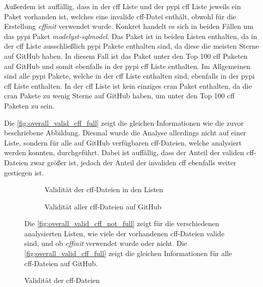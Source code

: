 Außerdem ist auffällig, dass in der \gls{cff} Liste und der \gls{pypi} \gls{cff} Liste jeweils ein Paket vorhanden ist, welches eine invalide \gls{cff}-Datei enthält, obwohl für die Erstellung \emph{cffinit} verwendet wurde.
Konkret handelt es sich in beiden Fällen um das \gls{pypi} Paket \emph{modelyst-sqlmodel}.
Das Paket ist in beiden Listen enthalten, da in der \gls{cff} Liste ausschließlich \gls{pypi} Pakete enthalten sind, da diese die meisten Sterne auf GitHub haben.
In diesem Fall ist das Paket unter den Top 100 \gls{cff} Paketen auf GitHub und somit ebenfalls in der \gls{pypi} \gls{cff} Liste enthalten.
Im Allgemeinen sind alle \gls{pypi} Pakete, welche in der \gls{cff} Liste enthalten sind, ebenfalls in der \gls{pypi} \gls{cff} Liste enthalten.
In der \gls{cff} Liste ist kein einziges \gls{cran} Paket enthalten, da die \gls{cran} Pakete zu wenig Sterne auf GitHub haben, um unter den Top 100 \gls{cff} Paketen zu sein.

Die \autoref{fig:overall_valid_cff_full} zeigt die gleichen Informationen wie die zuvor beschriebene Abbildung.
Diesmal wurde die Analyse allerdings nicht auf einer Liste, sondern für alle auf GitHub verfügbaren \gls{cff}-Dateien, welche analysiert werden konnten, durchgeführt.
Dabei ist auffällig, dass der Anteil der validen \gls{cff}-Dateien zwar größer ist, jedoch der Anteil der invaliden \gls{cff} ebenfalls weiter gestiegen ist.

\begin{figure}
    \begin{subfigure}{.5\textwidth}
        \centering
        
        \caption{Validität der \gls{cff}-Dateien in den Listen}
        \label{fig:overall_valid_cff_not_full}
    \end{subfigure}%
    \begin{subfigure}{.5\textwidth}
        \centering
        
        \caption{Validität aller \gls{cff}-Dateien auf GitHub}
        \label{fig:overall_valid_cff_full}
    \end{subfigure}
    \caption{Validität der \gls{cff}-Dateien}
    \label{fig:overall_valid_cff}
    \small
    Die \autoref{fig:overall_valid_cff_not_full} zeigt für die verschiedenen analysierten Listen, wie viele der vorhandenen \gls{cff}-Dateien valide sind, und ob \emph{cffinit} verwendet wurde oder nicht. Die \autoref{fig:overall_valid_cff_full} zeigt die gleichen Informationen für alle \gls{cff}-Dateien auf GitHub.
\end{figure}

